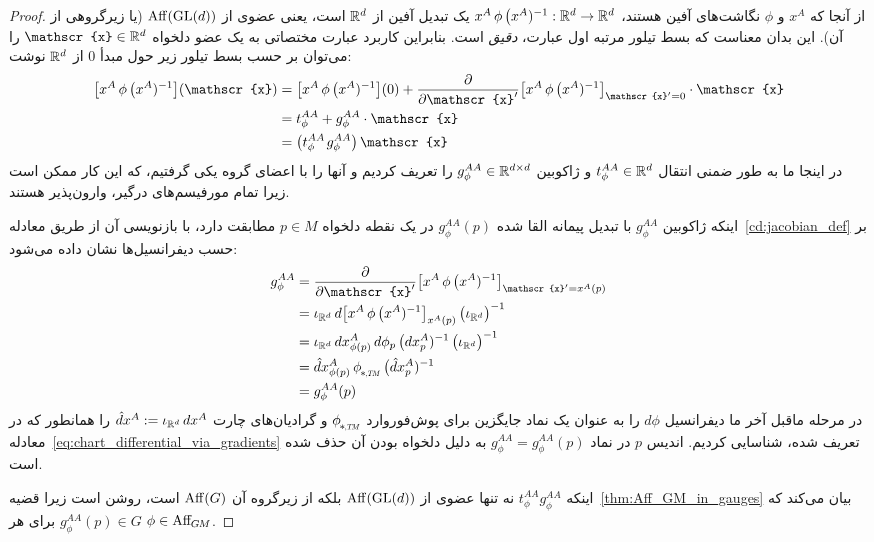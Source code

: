 \begin{proof}
	از آنجا که $x^A$ و $\phi$ نگاشت‌های آفین هستند، $x^A \,\phi\, \big(x^A)^{-1}: \mathbb{R}^d \to \mathbb{R}^d$ یک تبدیل آفین از $\mathbb{R}^d$ است، یعنی عضوی از $\operatorname{Aff}(\operatorname{GL}(d))$ (یا زیرگروهی از آن).
	این بدان معناست که بسط تیلور مرتبه اول عبارت، \emph{دقیق} است.
	بنابراین کاربرد عبارت مختصاتی به یک عضو دلخواه $\mathscr{x} \in \R^d$ را می‌توان بر حسب بسط تیلور زیر حول مبدأ $0$ از $\mathbb{R}^d$ نوشت:
	\begin{align}
		\big[ x^A \,\phi\, \big(x^A)^{-1} \big] (\mathscr{x})
		&= \big[ x^A \,\phi\, \big(x^A)^{-1} \big] (0) + 
		\frac{\partial}{\partial \mathscr{x}'} \big[ x^A \,\phi\, \big(x^A)^{-1} \big]_{\mathscr{x}' = 0} \cdot \mathscr{x} \notag \\
		&= t_\phi^{AA} + g_\phi^{AA} \cdot \mathscr{x} \notag \\
		&= \big( t_\phi^{AA} \mkern2mu g_\phi^{AA} \big) \, \mathscr{x}
	\end{align}
	در اینجا ما به طور ضمنی انتقال $t_\phi^{AA} \in \mathbb{R}^d$ و ژاکوبین $g_\phi^{AA} \in \mathbb{R}^{d\times d}$ را تعریف کردیم و آنها را با اعضای گروه یکی گرفتیم، که این کار ممکن است زیرا تمام مورفیسم‌های درگیر، وارون‌پذیر هستند.
	
	اینکه ژاکوبین $g_\phi^{AA}$ با تبدیل پیمانه القا شده $g_\phi^{AA}(p)$ در یک نقطه دلخواه $p\in M$ مطابقت دارد، با بازنویسی آن از طریق معادله~\eqref{cd:jacobian_def} بر حسب دیفرانسیل‌ها نشان داده می‌شود:
	\begin{align}
		g_\phi^{AA}
		&= \frac{\partial}{\partial \mathscr{x}'} \big[ x^A \,\phi\, \big(x^A)^{-1} \big]_{\mathscr{x}' = x^A(p)} \notag \\
		&= \iota_{\R^d}\, d\big[ x^A \,\phi\, \big(x^A)^{-1} \big]_{x^A(p)} \, \big(\iota_{\R^d} \big)^{-1} \notag \\
		&= \iota_{\R^d}\, dx^A_{\phi(p)} \,d\phi_p\, \big(dx^A_p)^{-1}\, \big(\iota_{\R^d} \big)^{-1} \notag \\
		&= \hat{d}x^A_{\phi(p)} \,\dphiTM\, \big(\hat{d}x^A_p)^{-1} \notag \\
		&= g_\phi^{AA}(p)
	\end{align}
	در مرحله ماقبل آخر ما دیفرانسیل $d\phi$ را به عنوان یک نماد جایگزین برای پوش‌فوروارد $\dphiTM$ و گرادیان‌های چارت $\hat{d}x^A := \iota_{\mathbb{R}^d}\, dx^A$ را همانطور که در معادله~\eqref{eq:chart_differential_via_gradients} تعریف شده، شناسایی کردیم.
	اندیس $p$ در نماد $g_\phi^{AA} = g_\phi^{AA}(p)$ به دلیل دلخواه بودن آن حذف شده است.
	
	اینکه $t_\phi^{AA} g_\phi^{AA}$ نه تنها عضوی از $\operatorname{Aff}(\operatorname{GL}(d))$ بلکه از زیرگروه آن $\operatorname{Aff}(G)$ است، روشن است زیرا قضیه~\ref{thm:Aff_GM_in_gauges} بیان می‌کند که $g_\phi^{AA}(p) \in G$ برای هر $\phi \in \operatorname{Aff}_{\mkern-2muG\mkern-1.4muM}$.
	

\end{proof}
